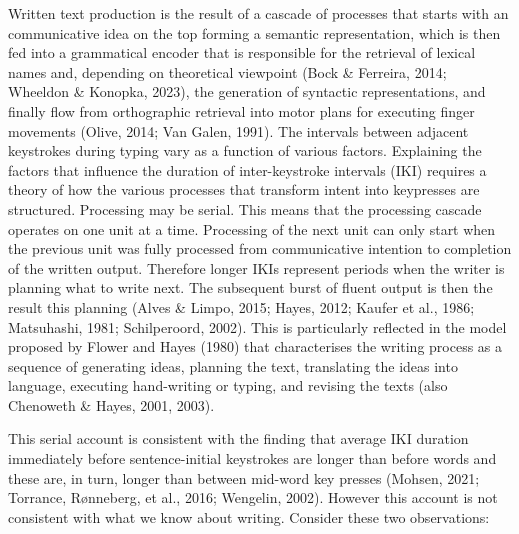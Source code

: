 \documentclass[
  man,floatsintext]{apa7}
\begin{document}
Written text production is the result of a cascade of processes that starts with an communicative idea on the top forming a semantic representation, which is then fed into a grammatical encoder that is responsible for the retrieval of lexical names and, depending on theoretical viewpoint (Bock \& Ferreira, 2014; Wheeldon \& Konopka, 2023), the generation of syntactic representations, and finally flow from orthographic retrieval into motor plans for executing finger movements (Olive, 2014; Van Galen, 1991). The intervals between adjacent keystrokes during typing vary as a function of various factors. Explaining the factors that influence the duration of inter-keystroke intervals (IKI) requires a theory of how the various processes that transform intent into keypresses are structured. Processing may be serial. This means that the processing cascade operates on one unit at a time. Processing of the next unit can only start when the previous unit was fully processed from communicative intention to completion of the written output. Therefore longer IKIs represent periods when the writer is planning what to write next. The subsequent burst of fluent output is then the result this planning (Alves \& Limpo, 2015; Hayes, 2012; Kaufer et al., 1986; Matsuhashi, 1981; Schilperoord, 2002). This is particularly reflected in the model proposed by Flower and Hayes (1980) that characterises the writing process as a sequence of generating ideas, planning the text, translating the ideas into language, executing hand-writing or typing, and revising the texts (also Chenoweth \& Hayes, 2001, 2003).

This serial account is consistent with the finding that average IKI duration immediately before sentence-initial keystrokes are longer than before words and these are, in turn, longer than between mid-word key presses (Mohsen, 2021; Torrance, Rønneberg, et al., 2016; Wengelin, 2002). However this account is not consistent with what we know about writing. Consider these two observations:
\end{document}
